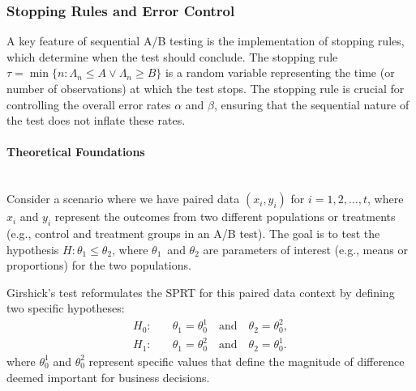 \documentclass[magisterska, english]{pwr_wmat_praca_dyplomowa}
\theoremstyle{plain}
\numberwithin{theorem}{chapter}
\theoremstyle{definition}
\numberwithin{theorem}{chapter}
\newcommand{\myparagraph}[1]{\paragraph{#1}\mbox{}\\}
\begin{document}
%

\subsubsection{Stopping Rules and Error Control}

A key feature of sequential A/B testing is the implementation of stopping rules, which determine when the test should conclude. The stopping rule \( \tau = \min\{n:\Lambda_n \le A \vee \Lambda_n \ge B\}\) is a random variable representing the time (or number of observations) at which the test stops. The stopping rule is crucial for controlling the overall error rates \( \alpha \) and \( \beta \), ensuring that the sequential nature of the test does not inflate these rates.
\myparagraph{Theoretical Foundations}

Consider a scenario where we have paired data \((x_i, y_i)\) for \(i = 1, 2, \dots, t\), where \(x_i\) and \(y_i\) represent the outcomes from two different populations or treatments (e.g., control and treatment groups in an A/B test). The goal is to test the hypothesis \(H: \theta_1 \leq \theta_2\), where \(\theta_1\)~and \(\theta_2\) are parameters of interest (e.g., means or proportions) for the two populations.

Girshick's test reformulates the SPRT for this paired data context by defining two specific hypotheses:
\begin{align*}
	H_0: &\quad \theta_1 = \theta_0^1 \quad \text{and} \quad \theta_2 = \theta_0^2, \\
	H_1: &\quad \theta_1 = \theta_0^2 \quad \text{and} \quad \theta_2 = \theta_0^1.
\end{align*}
where \(\theta_0^1\) and \(\theta_0^2\) represent specific values that define the magnitude of difference deemed important for business decisions.
\end{document}
